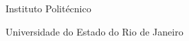 \begin{siglas}
\item[IPRJ] Instituto Politécnico
\item[UERJ] Universidade do Estado do Rio de Janeiro
\end{siglas}